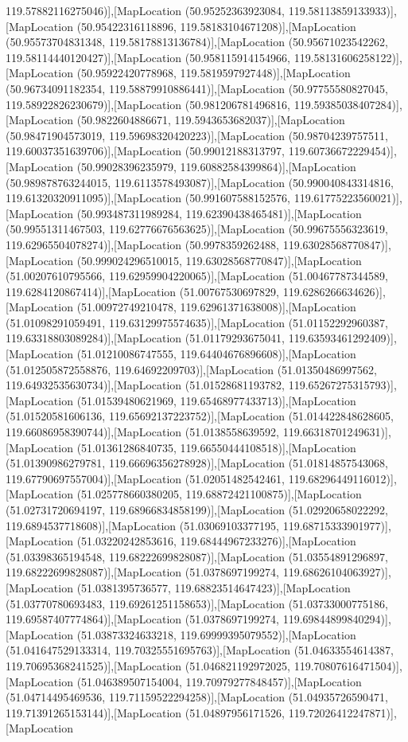 119.57882116275046)],[MapLocation (50.95252363923084, 119.58113859133933)],[MapLocation (50.95422316118896, 119.58183104671208)],[MapLocation (50.95573704831348, 119.58178813136784)],[MapLocation (50.95671023542262, 119.58114440120427)],[MapLocation (50.958115914154966, 119.58131606258122)],[MapLocation (50.95922420778968, 119.5819597927448)],[MapLocation (50.96734091182354, 119.58879910886441)],[MapLocation (50.97755580827045, 119.58922826230679)],[MapLocation (50.981206781496816, 119.59385038407284)],[MapLocation (50.9822604886671, 119.5943653682037)],[MapLocation (50.98471904573019, 119.59698320420223)],[MapLocation (50.98704239757511, 119.60037351639706)],[MapLocation (50.99012188313797, 119.60736672229454)],[MapLocation (50.99028396235979, 119.60882584399864)],[MapLocation (50.989878763244015, 119.6113578493087)],[MapLocation (50.990040843314816, 119.61320320911095)],[MapLocation (50.991607588152576, 119.61775223560021)],[MapLocation (50.993487311989284, 119.62390438465481)],[MapLocation (50.99551311467503, 119.62776676563625)],[MapLocation (50.99675556323619, 119.62965504078274)],[MapLocation (50.9978359262488, 119.63028568770847)],[MapLocation (50.999024296510015, 119.63028568770847)],[MapLocation (51.00207610795566, 119.62959904220065)],[MapLocation (51.00467787344589, 119.6284120867414)],[MapLocation (51.00767530697829, 119.6286266634626)],[MapLocation (51.00972749210478, 119.62961371638008)],[MapLocation (51.01098291059491, 119.63129975574635)],[MapLocation (51.01152292960387, 119.63318803089284)],[MapLocation (51.01179293675041, 119.63593461292409)],[MapLocation (51.01210086747555, 119.64404676896608)],[MapLocation (51.012505872558876, 119.64692209703)],[MapLocation (51.01350486997562, 119.64932535630734)],[MapLocation (51.01528681193782, 119.65267275315793)],[MapLocation (51.01539480621969, 119.65468977433713)],[MapLocation (51.01520581606136, 119.65692137223752)],[MapLocation (51.014422848628605, 119.66086958390744)],[MapLocation (51.0138558639592, 119.66318701249631)],[MapLocation (51.01361286840735, 119.66550444108518)],[MapLocation (51.01390986279781, 119.66696356278928)],[MapLocation (51.01814857543068, 119.67790697557004)],[MapLocation (51.02051482542461, 119.68296449116012)],[MapLocation (51.025778660380205, 119.68872421100875)],[MapLocation (51.02731720694197, 119.68966834858199)],[MapLocation (51.02920658022292, 119.6894537718608)],[MapLocation (51.03069103377195, 119.68715333901977)],[MapLocation (51.03220242853616, 119.68444967233276)],[MapLocation (51.03398365194548, 119.68222699828087)],[MapLocation (51.03554891296897, 119.68222699828087)],[MapLocation (51.0378697199274, 119.68626104063927)],[MapLocation (51.0381395736577, 119.68823514647423)],[MapLocation (51.03770780693483, 119.69261251158653)],[MapLocation (51.03733000775186, 119.69587407774864)],[MapLocation (51.0378697199274, 119.69844899840294)],[MapLocation (51.03873324633218, 119.69999395079552)],[MapLocation (51.041647529133314, 119.70325551695763)],[MapLocation (51.04633554614387, 119.70695368241525)],[MapLocation (51.046821192972025, 119.70807616471504)],[MapLocation (51.046389507154004, 119.70979277848457)],[MapLocation (51.04714495469536, 119.71159522294258)],[MapLocation (51.04935726590471, 119.71391265153144)],[MapLocation (51.04897956171526, 119.72026412247871)],[MapLocation 